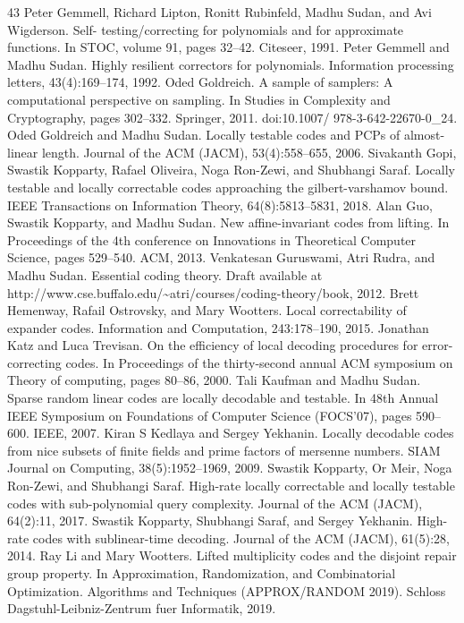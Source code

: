 \documentclass[10pt,a4paper]{article}
\begin{document}
\begin{thebibliography}{43}
Peter Gemmell, Richard Lipton, Ronitt Rubinfeld, Madhu Sudan, and Avi Wigderson. Self- testing/correcting for polynomials and for approximate functions. In STOC, volume 91, pages 32–42. Citeseer, 1991.
Peter Gemmell and Madhu Sudan. Highly resilient correctors for polynomials. Information processing letters, 43(4):169–174, 1992.
Oded Goldreich. A sample of samplers: A computational perspective on sampling. In Studies in Complexity and Cryptography, pages 302–332. Springer, 2011. doi:10.1007/ 978-3-642-22670-0\_24.
Oded Goldreich and Madhu Sudan. Locally testable codes and PCPs of almost-linear length. Journal of the ACM (JACM), 53(4):558–655, 2006.
Sivakanth Gopi, Swastik Kopparty, Rafael Oliveira, Noga Ron-Zewi, and Shubhangi Saraf. Locally testable and locally correctable codes approaching the gilbert-varshamov bound. IEEE Transactions on Information Theory, 64(8):5813–5831, 2018.
Alan Guo, Swastik Kopparty, and Madhu Sudan. New affine-invariant codes from lifting. In Proceedings of the 4th conference on Innovations in Theoretical Computer Science, pages 529–540. ACM, 2013.
Venkatesan Guruswami, Atri Rudra, and Madhu Sudan. Essential coding theory. Draft available at http://www.cse.buffalo.edu/\textasciitilde{}atri/courses/coding-theory/book, 2012.
Brett Hemenway, Rafail Ostrovsky, and Mary Wootters. Local correctability of expander codes. Information and Computation, 243:178–190, 2015.
Jonathan Katz and Luca Trevisan. On the efficiency of local decoding procedures for error- correcting codes. In Proceedings of the thirty-second annual ACM symposium on Theory of computing, pages 80–86, 2000.
Tali Kaufman and Madhu Sudan. Sparse random linear codes are locally decodable and testable. In 48th Annual IEEE Symposium on Foundations of Computer Science (FOCS’07), pages 590–600. IEEE, 2007.
Kiran S Kedlaya and Sergey Yekhanin. Locally decodable codes from nice subsets of finite fields and prime factors of mersenne numbers. SIAM Journal on Computing, 38(5):1952–1969, 2009.
Swastik Kopparty, Or Meir, Noga Ron-Zewi, and Shubhangi Saraf. High-rate locally correctable and locally testable codes with sub-polynomial query complexity. Journal of the ACM (JACM), 64(2):11, 2017.
Swastik Kopparty, Shubhangi Saraf, and Sergey Yekhanin. High-rate codes with sublinear-time decoding. Journal of the ACM (JACM), 61(5):28, 2014.
Ray Li and Mary Wootters. Lifted multiplicity codes and the disjoint repair group property. In Approximation, Randomization, and Combinatorial Optimization. Algorithms and Techniques (APPROX/RANDOM 2019). Schloss Dagstuhl-Leibniz-Zentrum fuer Informatik, 2019.

\end{thebibliography}
\end{document}
